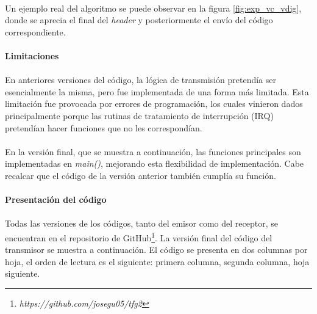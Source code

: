 \paragraph{}
Un ejemplo real del algoritmo se puede observar en la figura \ref{fig:exp_vc_vdig}, donde se aprecia el final del \textit{header} y posteriormente el env\'io del c\'odigo correspondiente.

\paragraph{Limitaciones}
\paragraph{}
En anteriores versiones del c\'odigo, la l\'ogica de transmisi\'on pretendía ser esencialmente la misma, pero fue implementada de una forma más limitada. Esta limitación fue provocada por errores de programación, los cuales vinieron dados principalmente porque las rutinas de tratamiento de interrupción (IRQ) pretendían hacer funciones que no les correspondían.
\paragraph{}
En la versión final, que se muestra a continuaci\'on, las funciones principales son implementadas en \textit{main()}, mejorando esta flexibilidad de implementación. Cabe recalcar que el código de la versión anterior también cumplía su función.
\paragraph{Presentaci\'on del c\'odigo}
\paragraph{}
Todas las versiones de los c\'odigos, tanto del emisor como del receptor, se encuentran en el repositorio de GitHub\footnote{\textit{https://github.com/josegu05/tfg2}}. La versi\'on final del c\'odigo del transmisor se muestra a continuaci\'on. El c\'odigo se presenta en dos columnas por hoja, el orden de lectura es el siguiente: primera columna, segunda columna, hoja siguiente.

